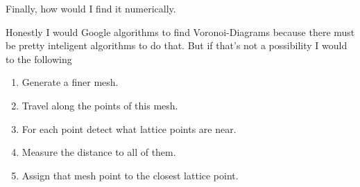 \begin{questions}
\begin{solution}
  Finally, how would I find it numerically.

  Honestly I would Google algorithms to find Voronoi-Diagrams because there must be pretty inteligent algorithms to do that. But if that's not a possibility I would to the following
  \begin{enumerate}
    \item Generate a finer mesh.
    \item Travel along the points of this mesh.
    \item For each point detect what lattice points are near.
    \item Measure the distance to all of them.
    \item Assign that mesh point to the closest lattice point.
  \end{enumerate}

\end{solution}
\end{questions}

%
%
